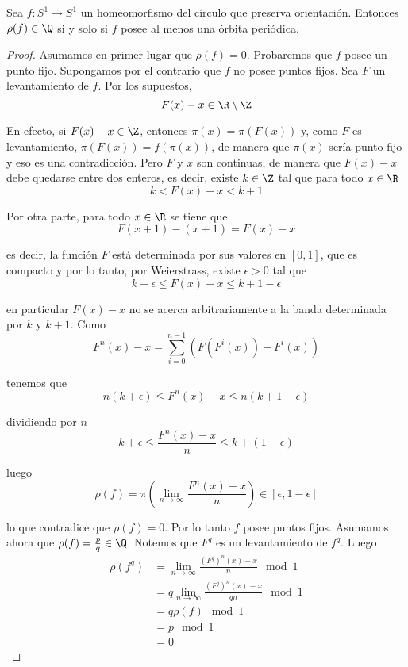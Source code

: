 \documentclass[	docname= Sistemas\ Din\'amicos,
				finished=1,
				semester=1,
				year=2017,
				professor=Godofredo\ Iommi,
				sigla=MAT2565]{apunte}
\begin{document}
\begin{teo} Sea $f: S^{1} \to S^{1}$ un homeomorfismo del círculo que preserva orientación. Entonces $\rho(f) \in \Q$ si y solo si $f$ posee al menos una órbita periódica.
\end{teo}

\begin{proof} \iffdem{\Longrightarrow}
Asumamos en primer lugar que $\rho(f) = 0$. Probaremos que $f$ posee un punto fijo. Supongamos por el contrario que $f$ no posee puntos fijos. Sea $F$ un levantamiento de $f$. Por los supuestos,
	$$F(x) - x \in \R \setminus \Z$$

En efecto, si $F(x) - x \in \Z$, entonces $\pi(x) = \pi(F(x))$ y, como $F$ es levantamiento, $\pi(F(x)) = f(\pi(x))$, de manera que $\pi(x)$ sería punto fijo y eso es una contradicción. Pero $F$ y $x$ son continuas, de manera que $F(x) - x$ debe quedarse entre dos enteros, es decir, existe $k \in \Z$ tal que para todo $x \in \R$
	$$k < F(x) - x < k+1$$

Por otra parte, para todo $x \in \R$ se tiene que
	$$F(x+1) - (x+1) = F(x) - x$$

es decir, la función $F$ está determinada por sus valores en $[0,1]$, que es compacto y por lo tanto, por Weierstrass, existe $\epsilon > 0$ tal que 
	$$k + \epsilon \leq F(x) - x \leq k+1 - \epsilon$$

en particular $F(x) - x$ no se acerca arbitrariamente a la banda determinada por $k$ y $k+1$. Como
	$$F^{n}(x) - x = \sum_{i=0}^{n-1} (F(F^{i}(x)) - F^{i}(x))$$

tenemos que
	$$n(k+\epsilon) \leq F^{n}(x) - x \leq n(k+1 - \epsilon)$$

dividiendo por $n$
	$$k+\epsilon \leq \frac{F^{n}(x) - x}{n} \leq k+ (1 -\epsilon)$$

luego
	$$\rho(f) = \pi \left(\lim_{n \to \infty} \frac{F^{n}(x)- x}{n} \right) \in [\epsilon, 1- \epsilon]$$

lo que contradice que $\rho(f) = 0$. Por lo tanto $f$ posee puntos fijos. Asumamos ahora que $\rho(f) = \frac{p}{q} \in \Q$. Notemos que $F^{q}$ es un levantamiento de $f^{q}$. Luego
	\begin{align*}
		\rho(f^{q})	&=	\lim_{n \to \infty} \frac{(F^{q})^{n}(x) - x}{n} \mod 1	\\
				&=	q\lim_{n \to \infty} \frac{(F^{q})^{n}(x) - x}{qn} \mod 1	\\
				&=	q\rho(f) \mod 1	\\
				&=	p \mod 1	\\
				&=	0
	\end{align*}


\end{proof}
\end{document}
